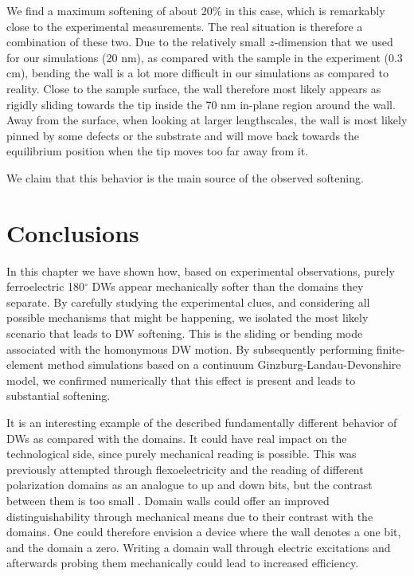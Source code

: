 We find a maximum softening of about 20\% in this case, which is remarkably close to the experimental measurements.
The real situation is therefore a combination of these two. Due to the relatively small $z$-dimension that we used for our simulations (20 nm), as compared with the sample in the experiment (0.3 cm), bending the wall is a lot more difficult in our simulations as compared to reality.
Close to the sample surface, the wall therefore most likely appears as rigidly sliding towards the tip inside the 70 nm in-plane region around the wall.
Away from the surface, when looking at larger lengthscales, the wall is most likely pinned by some defects or the substrate and will move back towards the equilibrium position when the tip moves too far away from it.

We claim that this behavior is the main source of the observed softening.

\section{Conclusions}
In this chapter we have shown how, based on experimental observations, purely ferroelectric 180$^\circ$ DWs appear mechanically softer than the domains they separate.
By carefully studying the experimental clues, and considering all possible mechanisms that might be happening, we isolated the most likely scenario that leads to DW softening.
This is the sliding or bending mode associated with the homonymous DW motion.
By subsequently performing finite-element method simulations based on a continuum Ginzburg-Landau-Devonshire model, we confirmed numerically that this effect is present and leads to substantial softening. 

It is an interesting example of the described fundamentally different behavior of DWs as compared with the domains.
It could have real impact on the technological side, since purely mechanical reading is possible.
This was previously attempted through flexoelectricity and the reading of different polarization domains as an analogue to up and down bits, but the contrast between them is too small \cite{Cordero-Edwards2017}.
Domain walls could offer an improved distinguishability through mechanical means due to their contrast with the domains.
One could therefore envision a device where the wall denotes a one bit, and the domain a zero.
Writing a domain wall through electric excitations and afterwards probing them mechanically could lead to increased efficiency.
